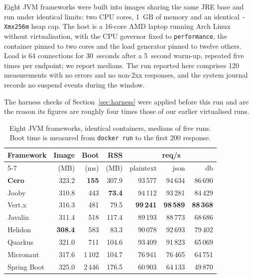 \documentclass[preprint,12pt]{elsarticle}
\begin{document}
Eight JVM frameworks were built into images sharing the same JRE base and run
under identical limits: two CPU cores, 1~GB of memory and an identical
\texttt{-Xmx256m} heap cap. The host is a 16-core AMD laptop running Arch Linux
without virtualisation, with the CPU governor fixed to \texttt{performance}, the
container pinned to two cores and the load generator pinned to twelve others.
Load is 64 connections for 30~seconds after a 5~second warm-up, repeated five
times per endpoint; we report medians. The run reported here comprises 120
measurements with no errors and no non-2xx responses, and the system journal
records no suspend events during the window.

The harness checks of Section~\ref{sec:harness} were applied before this run and
are the reason its figures are roughly four times those of our earlier
virtualised runs.

\begin{table}[ht]
\centering
\caption{Eight JVM frameworks, identical containers, medians of five runs.
         Boot time is measured from \texttt{docker run} to the first 200
         response.}
\label{tab:evaluation}
\begin{tabular}{lrrrrrr}
\toprule
Framework & Image & Boot & RSS & \multicolumn{3}{c}{req/s} \\
\cmidrule(lr){5-7}
          & (MB)  & (ms) & (MB) & plaintext & json & db \\
\midrule
\textbf{Cero} & 323.2 & \textbf{155} & 307.9 & 93\,577 & 94\,634 & 86\,690 \\
Jooby        & 310.8 & 443  & \textbf{73.4}  & 94\,112 & 93\,281 & 84\,429 \\
Vert.x       & 316.3 & 481  & 79.5  & \textbf{99\,241} & \textbf{98\,589} & \textbf{88\,368} \\
Javalin      & 311.4 & 518  & 117.4 & 89\,193 & 88\,773 & 68\,686 \\
Helidon      & \textbf{308.4} & 583 & 83.3 & 90\,078 & 92\,693 & 79\,402 \\
Quarkus      & 321.0 & 711  & 104.6 & 93\,409 & 91\,823 & 65\,069 \\
Micronaut    & 317.6 & 1\,102 & 104.7 & 76\,941 & 76\,465 & 64\,751 \\
Spring Boot  & 325.0 & 2\,446 & 176.5 & 60\,903 & 64\,133 & 49\,870 \\
\bottomrule
\end{tabular}
\end{table}
\end{document}
